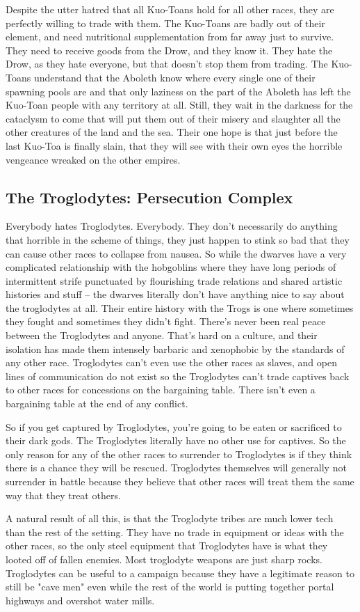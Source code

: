 Despite the utter hatred that all Kuo-Toans hold for all other races, they are perfectly willing to trade with them. The Kuo-Toans are badly out of their element, and need nutritional supplementation from far away just to survive. They need to receive goods from the Drow, and they know it. They hate the Drow, as they hate everyone, but that doesn't stop them from trading. The Kuo-Toans understand that the Aboleth know where every single one of their spawning pools are and that only laziness on the part of the Aboleth has left the Kuo-Toan people with any territory at all. Still, they wait in the darkness for the cataclysm to come that will put them out of their misery and slaughter all the other creatures of the land and the sea. Their one hope is that just before the last Kuo-Toa is finally slain, that they will see with their own eyes the horrible vengeance wreaked on the other empires.\\



\subsection{The Troglodytes: Persecution Complex}

Everybody hates Troglodytes. Everybody. They don't necessarily do anything that horrible in the scheme of things, they just happen to stink so bad that they can cause other races to collapse from nausea. So while the dwarves have a very complicated relationship with the hobgoblins where they have long periods of intermittent strife punctuated by flourishing trade relations and shared artistic histories and stuff -- the dwarves literally don't have anything nice to say about the troglodytes at all. Their entire history with the Trogs is one where sometimes they fought and sometimes they didn't fight. There's never been real peace between the Troglodytes and anyone. That's hard on a culture, and their isolation has made them intensely barbaric and xenophobic by the standards of any other race. Troglodytes can't even use the other races as slaves, and open lines of communication do not exist so the Troglodytes can't trade captives back to other races for concessions on the bargaining table. There isn't even a bargaining table at the end of any conflict.

So if you get captured by Troglodytes, you're going to be eaten or sacrificed to their dark gods. The Troglodytes literally have no other use for captives. So the only reason for any of the other races to surrender to Troglodytes is if they think there is a chance they will be rescued. Troglodytes themselves will generally not surrender in battle because they believe that other races will treat them the same way that they treat others.

A natural result of all this, is that the Troglodyte tribes are much lower tech than the rest of the setting. They have no trade in equipment or ideas with the other races, so the only steel equipment that Troglodytes have is what they looted off of fallen enemies. Most troglodyte weapons are just sharp rocks. Troglodytes can be useful to a campaign because they have a legitimate reason to still be "cave men" even while the rest of the world is putting together portal highways and overshot water mills.
